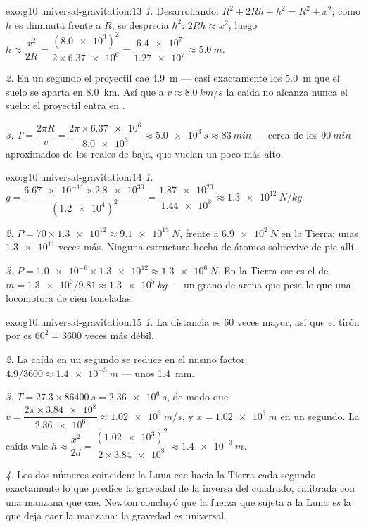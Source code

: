 \begin{solution}{exo:g10:universal-gravitation:13}
\emph{1.} Desarrollando: $R^2 + 2Rh + h^2 = R^2 + x^2$; como $h$ es
diminuta frente a $R$, se desprecia $h^2$: $2Rh \approx x^2$, luego
$h \approx \dfrac{x^2}{2R}
= \dfrac{(\num{8.0e3})^2}{2 \times \num{6.37e6}}
= \dfrac{\num{6.4e7}}{\num{1.27e7}} \approx \qty{5.0}{m}$.

\emph{2.} En un segundo el proyectil cae \qty{4.9}{m} --- casi
exactamente los \qty{5.0}{m} que el suelo se aparta en \qty{8.0}{km}.
Así que a $v \approx \qty{8.0}{km/s}$ la caída no alcanza nunca el
suelo: el proyectil entra en .

\emph{3.} $T = \dfrac{2\pi R}{v}
= \dfrac{2\pi \times \num{6.37e6}}{\num{8.0e3}}
\approx \qty{5.0e3}{s} \approx \qty{83}{min}$ --- cerca de los
$\qty{90}{min}$ aproximados de los  reales de  baja, que
vuelan un poco más alto.
\end{solution}

\begin{solution}{exo:g10:universal-gravitation:14}
\emph{1.} $g = \dfrac{\num{6.67e-11} \times \num{2.8e30}}
{(\num{1.2e4})^2} = \dfrac{\num{1.87e20}}{\num{1.44e8}}
\approx \qty{1.3e12}{N/kg}.$

\emph{2.} $P = 70 \times \num{1.3e12} \approx \qty{9.1e13}{N}$, frente a
$\qty{6.9e2}{N}$ en la Tierra: unas $\num{1.3e11}$ veces más. Ninguna
estructura hecha de átomos sobrevive de pie allí.

\emph{3.} $P = \num{1.0e-6} \times \num{1.3e12} \approx
\qty{1.3e6}{N}$. En la Tierra ese es el  de
$m = \num{1.3e6}/9.81 \approx \qty{1.3e5}{kg}$ --- un grano de arena que
pesa lo que una locomotora de cien toneladas.
\end{solution}

\begin{solution}{exo:g10:universal-gravitation:15}
\emph{1.} La distancia es $60$ veces mayor, así que el tirón por
 es $60^2 = 3600$ veces más débil.

\emph{2.} La caída en un segundo se reduce en el mismo factor:
$4.9/3600 \approx \qty{1.4e-3}{m}$ --- unos \qty{1.4}{mm}.

\emph{3.} $T = 27.3 \times \qty{86400}{s} = \qty{2.36e6}{s}$, de modo
que $v = \dfrac{2\pi \times \num{3.84e8}}{\num{2.36e6}} \approx
\qty{1.02e3}{m/s}$, y $x = \qty{1.02e3}{m}$ en un segundo. La caída vale
$h \approx \dfrac{x^2}{2d}
= \dfrac{(\num{1.02e3})^2}{2 \times \num{3.84e8}}
\approx \qty{1.4e-3}{m}$.

\emph{4.} Los dos números coinciden: la Luna cae hacia la Tierra cada
segundo exactamente lo que predice la gravedad de la inversa del
cuadrado, calibrada con una manzana que cae. Newton concluyó que la
fuerza que sujeta a la Luna \emph{es} la que deja caer la manzana: la
gravedad es universal.
\end{solution}

